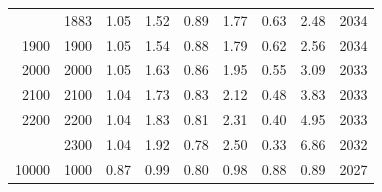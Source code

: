 \begin{table}[htbp]
\begin{tabular}[t]{rrrrrrrrr}
\addlinespace
1883 & 1883 & 1.05 & 1.52 & 0.89 & 1.77 & 0.63 & 2.48 & 2034\\
1900 & 1900 & 1.05 & 1.54 & 0.88 & 1.79 & 0.62 & 2.56 & 2034\\
2000 & 2000 & 1.05 & 1.63 & 0.86 & 1.95 & 0.55 & 3.09 & 2033\\
2100 & 2100 & 1.04 & 1.73 & 0.83 & 2.12 & 0.48 & 3.83 & 2033\\
2200 & 2200 & 1.04 & 1.83 & 0.81 & 2.31 & 0.40 & 4.95 & 2033\\
\addlinespace
2300 & 2300 & 1.04 & 1.92 & 0.78 & 2.50 & 0.33 & 6.86 & 2032\\
10000 & 1000 & 0.87 & 0.99 & 0.80 & 0.98 & 0.88 & 0.89 & 2027\\
\bottomrule
\end{tabular}
\end{table}
